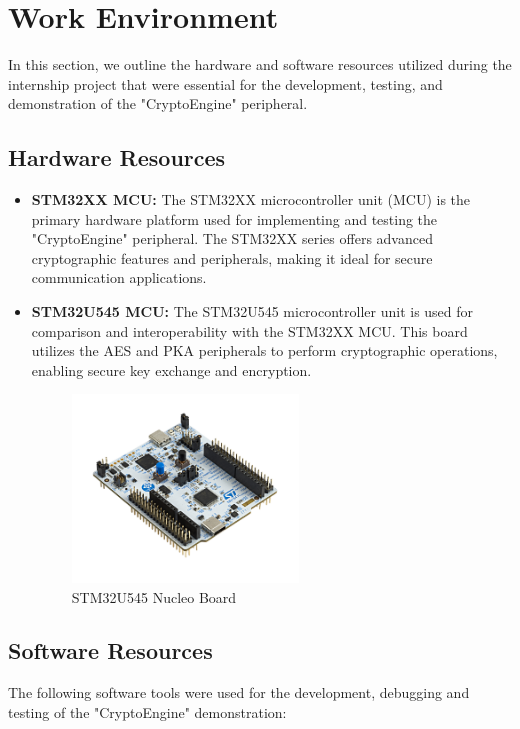 \section{Work Environment}
In this section, we outline the hardware and software resources utilized during the internship project that were essential for the development, testing, and demonstration of the "CryptoEngine" peripheral.

\subsection{Hardware Resources}
\begin{itemize}
    \item \textbf{STM32XX MCU:} The STM32XX microcontroller unit (MCU) is the primary hardware platform used for implementing and testing the "CryptoEngine" peripheral. The STM32XX series offers advanced cryptographic features and peripherals, making it ideal for secure communication applications.
    \item \textbf{STM32U545 MCU:} The STM32U545 microcontroller unit is used for comparison and interoperability with the STM32XX MCU. This board utilizes the AES and PKA peripherals to perform cryptographic operations, enabling secure key exchange and encryption.
    \begin{figure}[H]
  \centering
  \includegraphics[width=6cm]{img/U5 Nucleo.jpg}
  \caption{STM32U545 Nucleo Board}
  \label{fig:IAR}
\end{figure}
\end{itemize}

\subsection{Software Resources}
The following software tools were used for the  development, debugging and testing of the "CryptoEngine" demonstration:

